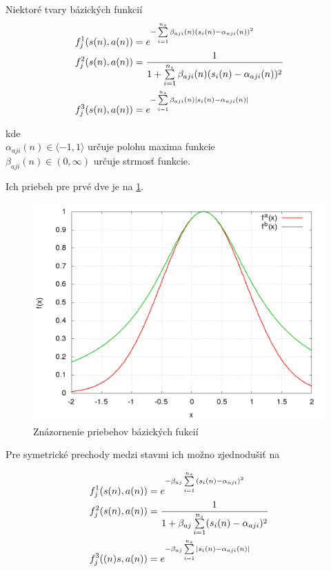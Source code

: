 Niektoré tvary bázických funkcií
\begin{align}
    f_j^1(\boldmath{s(n), a(n)}) &= e^{ -\sum\limits_{i=1}^{n_s}{\beta_{aji}(n)(s_i(n) - \alpha_{aji}(n))^2} }  \\
    f_j^2(\boldmath{s(n), a(n)}) &= \frac{1}{1 + \sum\limits_{i=1}^{n_s}{\beta_{aji}(n)(s_i(n) - \alpha_{aji}(n))^2}}  \\
    f_j^3(\boldmath{s(n), a(n)}) &= e^{ -\sum\limits_{i=1}^{n_s}{\beta_{aji}(n)\mid s_i(n) - \alpha_{aji}(n) \mid} }
\end{align}

kde \\
$\alpha_{aji}(n) \in \langle -1, 1 \rangle$ určuje polohu maxima funkcie \\
$\beta_{aji}(n) \in (0, \infty)$ určuje strmosť funkcie.

Ich priebeh pre prvé dve je na \ref{img:basis_funcions}.

\begin{figure}[]
\center
\includegraphics[scale=.4]{../pictures/gaussian_1D.png}
\caption{Znázornenie priebehov bázických fukcií}
\label{img:basis_funcions}
\end{figure}

Pre symetrické prechody medzi stavmi ich možno zjednodušiť na

\begin{align}
f_j^1(\boldmath{s(n), a(n)}) &= e^{ -\beta_{aj} \sum\limits_{i=1}^{n_s}{(s_i(n) - \alpha_{aji})^2} }  \\
f_j^2(\boldmath{s(n), a(n)}) &= \frac{1}{1 + {\beta_{aj} \sum\limits_{i=1}^{n_s}(s_i(n) - \alpha_{aji})^2}}  \\
f_j^3(\boldmath{(n)s, a(n)}) &= e^{ -\beta_{aj} \sum\limits_{i=1}^{n_s}{\mid s_i(n) - \alpha_{aji}(n) \mid} }
\label{eq:basis_functions}
\end{align}

